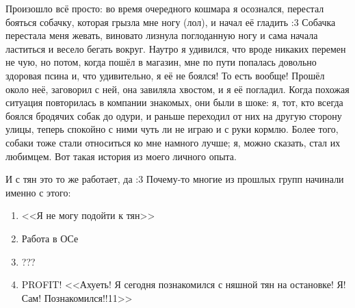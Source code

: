 \documentclass[a4paper,14pt,oneside]{memoir}
\begin{document}
Произошло всё просто: во время очередного кошмара я осознался, перестал бояться собачку, которая грызла мне ногу (лол), и начал её гладить :3 Собачка перестала меня жевать, виновато лизнула поглоданную ногу и сама начала ластиться и весело бегать вокруг. Наутро я удивился, что вроде никаких перемен не чую, но потом, когда пошёл в магазин, мне по пути попалась довольно здоровая псина и, что удивительно, я её не боялся! То есть вообще! Прошёл около неё, заговорил с ней, она завиляла хвостом, и я её погладил. Когда похожая ситуация повторилась в компании знакомых, они были в шоке: я, тот, кто всегда боялся бродячих собак до одури, и раньше переходил от них на другую сторону улицы, теперь спокойно с ними чуть ли не играю и с руки кормлю. Более того, собаки тоже стали относиться ко мне намного лучше; я, можно сказать, стал их любимцем. Вот такая история из моего личного опыта. 

И с тян это то же работает, да :3 Почему-то многие из прошлых групп начинали именно с этого:
\begin{enumerate}
\item <<Я не могу подойти к тян>>
\item Работа в ОСе
\item ???
\item PROFIT! <<Ахуеть! Я сегодня познакомился с няшной тян на остановке! Я! Сам! Познакомился!!11>>
\end{enumerate}
\end{document}
